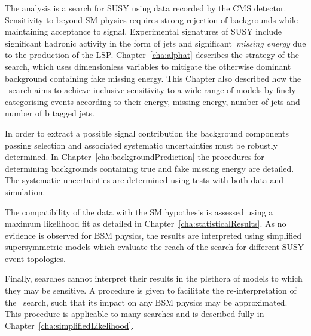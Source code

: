 The \alphat analysis is a search for SUSY using data recorded by the CMS detector. 
Sensitivity to beyond SM physics requires strong rejection of backgrounds while
maintaining acceptance to signal. Experimental signatures of SUSY include significant
hadronic activity in the form of jets and significant~\emph{missing energy} due to the production
of the LSP. Chapter~\ref{cha:alphat} describes the strategy of the \alphat search, which uses
dimensionless variables to mitigate the otherwise dominant background containing fake missing energy.
This Chapter also described how the \alphat~search aims to achieve inclusive sensitivity 
to a wide range of models by finely categorising events according to 
their energy, missing energy, number of jets and number of b tagged jets.

In order to extract a possible signal contribution the background components passing selection 
and associated systematic uncertainties must be robustly determined. In Chapter~\ref{cha:backgroundPrediction}
the procedures for determining backgrounds containing true and fake missing
energy are detailed. The systematic uncertainties are determined using tests with 
both data and simulation. 

The compatibility of the data with the SM hypothesis is assessed using a maximum likelihood fit 
as detailed in Chapter~\ref{cha:statisticalResults}. As no evidence is observed for BSM physics,
the results are interpreted using simplified supersymmetric models which evaluate the reach
of the search for different SUSY event topologies. 

Finally, searches cannot interpret their results in the plethora of models to which 
they may be sensitive. A procedure is given to facilitate the re-interpretation
of the \alphat~search, such that its impact on any BSM physics may be approximated.
This procedure is applicable to many searches and is described fully in 
Chapter~\ref{cha:simplifiedLikelihood}.
